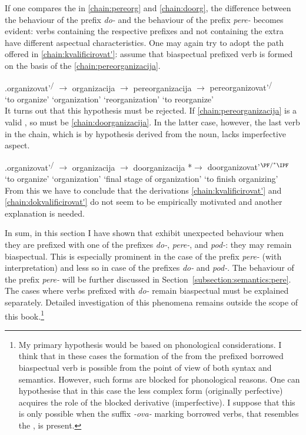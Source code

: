 If one compares the  in \ref{chain:pereorg} and \ref{chain:doorg}, the difference between the behaviour of the prefix \textit{do-} and the behaviour of the prefix \textit{pere-} becomes evident: verbs containing the respective prefixes and not containing the extra  have different aspectual characteristics. One may again try to adopt the path offered in \ref{chain:kvalificirovat'}: assume that biaspectual prefixed verb is formed on the basis of the  \ref{chain:pereorganizacija}.
 
\exg.\label{chain:pereorganizacija}organizovat'\textsuperscript{\PF\slash\IPF} {$\rightarrow$} organizacija {$\rightarrow$} pereorganizacija {$\rightarrow$} {pereorganizovat'\textsuperscript{\PF\slash\IPF}}\\
{`to organize'} {} `organization' {} `reorganization' {} {`to reorganize'}\\

It turns out that this hypothesis must be rejected. If \ref{chain:pereorganizacija} is a valid , so must be \ref{chain:doorganizacija}. In the latter case, however, the last verb in the chain, which is by hypothesis derived from the noun, lacks imperfective aspect. 

\exg.\label{chain:doorganizacija}organizovat'\textsuperscript{\PF\slash\IPF} {$\rightarrow$} organizacija {$\rightarrow$} doorganizacija {*$\rightarrow$} {doorganizovat'$^{{\PF}/^*{\IPF}}$}\\
{`to organize'} {} `organization' {} {`final stage of organization'} {} {`to finish organizing'}\\

From this we have to conclude that the derivations \ref{chain:kvalificirovat'} and \ref{chain:dokvalificirovat'} do not seem to be empirically motivated and another explanation is needed. 

In sum, in this section I have shown that   exhibit unexpected behaviour when they are prefixed with one of the prefixes \textit{do-}, \textit{pere-}, and \textit{pod-}: they may remain biaspectual. This is especially prominent in the case of the prefix \textit{pere-} (with  interpretation) and less so in case of the prefixes \textit{do-} and \textit{pod-}. The  behaviour of the prefix \textit{pere-} will be further discussed in Section~\ref{subsection:semantics:pere}. The cases where verbs prefixed with \textit{do-} remain biaspectual must be explained separately. Detailed investigation of this phenomena remains outside the scope of this book.\footnote{My primary hypothesis would be based on phonological considerations. I think that in these cases the formation of the  from the prefixed borrowed biaspectual verb is possible from the point of view of both syntax and semantics. However, such forms are blocked for phonological reasons. One can hypothesise that in this case the less complex form (originally perfective) acquires the role of the blocked derivative (imperfective). I suppose that this is only possible when the suffix \textit{-ova-} marking borrowed verbs, that resembles the , is present.}
	
